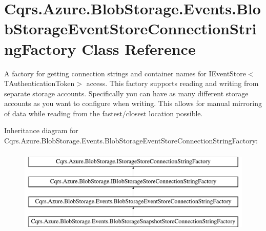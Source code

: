 \hypertarget{classCqrs_1_1Azure_1_1BlobStorage_1_1Events_1_1BlobStorageEventStoreConnectionStringFactory}{}\section{Cqrs.\+Azure.\+Blob\+Storage.\+Events.\+Blob\+Storage\+Event\+Store\+Connection\+String\+Factory Class Reference}
\label{classCqrs_1_1Azure_1_1BlobStorage_1_1Events_1_1BlobStorageEventStoreConnectionStringFactory}


A factory for getting connection strings and container names for I\+Event\+Store$<$\+T\+Authentication\+Token$>$ access. This factory supports reading and writing from separate storage accounts. Specifically you can have as many different storage accounts as you want to configure when writing. This allows for manual mirroring of data while reading from the fastest/closest location possible.  


Inheritance diagram for Cqrs.\+Azure.\+Blob\+Storage.\+Events.\+Blob\+Storage\+Event\+Store\+Connection\+String\+Factory\+:\begin{figure}[H]
\begin{center}
\leavevmode
\includegraphics[height=4.000000cm]{classCqrs_1_1Azure_1_1BlobStorage_1_1Events_1_1BlobStorageEventStoreConnectionStringFactory}
\end{center}
\end{figure}
